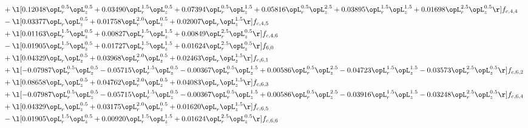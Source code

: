 \begin{alignat}{2}
& + \l[  0.12048 \opL_r^{0.5} \opL_z^{0.5} +  0.03490 \opL_r^{1.5} \opL_z^{0.5} +  0.07394 \opL_r^{0.5} \opL_z^{1.5} +  0.05816 \opL_r^{0.5} \opL_z^{2.5} +  0.03895 \opL_r^{1.5} \opL_z^{1.5} +  0.01698 \opL_r^{2.5} \opL_z^{0.5}  \r] f_{c,4,4} \nonumber \\ 
& - \l[  0.03377 \opL_r \opL_z^{0.5} +  0.01758 \opL_r^{2.0} \opL_z^{0.5} +  0.02007 \opL_r \opL_z^{1.5}  \r] f_{c,4,5} \nonumber \\ 
& + \l[  0.01163 \opL_r^{1.5} \opL_z^{0.5} +  0.00827 \opL_r^{1.5} \opL_z^{1.5} +  0.00849 \opL_r^{2.5} \opL_z^{0.5}  \r] f_{c,4,6} \nonumber \\ 
& - \l[  0.01905 \opL_r^{1.5} \opL_z^{0.5} +  0.01727 \opL_r^{1.5} \opL_z^{1.5} +  0.01624 \opL_r^{2.5} \opL_z^{0.5}  \r] f_{6,0} \nonumber \\ 
& + \l[  0.04329 \opL_r \opL_z^{0.5} +  0.03968 \opL_r^{2.0} \opL_z^{0.5} +  0.02463 \opL_r \opL_z^{1.5}  \r] f_{c,6,1} \nonumber \\ 
& + \l[  -0.07987 \opL_r^{0.5} \opL_z^{0.5}   -0.05715 \opL_r^{1.5} \opL_z^{0.5}   -0.00367 \opL_r^{0.5} \opL_z^{1.5} +  0.00586 \opL_r^{0.5} \opL_z^{2.5}   -0.04723 \opL_r^{1.5} \opL_z^{1.5}   -0.03573 \opL_r^{2.5} \opL_z^{0.5}  \r] f_{c,6,2} \nonumber \\ 
& + \l[  0.08658 \opL_r \opL_z^{0.5} +  0.04762 \opL_r^{2.0} \opL_z^{0.5} +  0.04083 \opL_r \opL_z^{1.5}  \r] f_{c,6,3} \nonumber \\ 
& + \l[  -0.07987 \opL_r^{0.5} \opL_z^{0.5}   -0.05715 \opL_r^{1.5} \opL_z^{0.5}   -0.00367 \opL_r^{0.5} \opL_z^{1.5} +  0.00586 \opL_r^{0.5} \opL_z^{2.5}   -0.03916 \opL_r^{1.5} \opL_z^{1.5}   -0.03248 \opL_r^{2.5} \opL_z^{0.5}  \r] f_{c,6,4} \nonumber \\ 
& + \l[  0.04329 \opL_r \opL_z^{0.5} +  0.03175 \opL_r^{2.0} \opL_z^{0.5} +  0.01620 \opL_r \opL_z^{1.5}  \r] f_{c,6,5} \nonumber \\ 
& - \l[  0.01905 \opL_r^{1.5} \opL_z^{0.5} +  0.00920 \opL_r^{1.5} \opL_z^{1.5} +  0.01624 \opL_r^{2.5} \opL_z^{0.5}  \r] f_{c,6,6} \nonumber \\ 
\end{alignat} 


